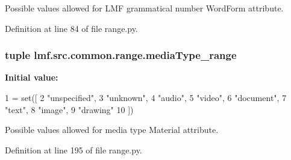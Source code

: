 Possible values allowed for L\+M\+F grammatical number Word\+Form attribute. 



Definition at line 84 of file range.\+py.

\hypertarget{namespacelmf_1_1src_1_1common_1_1range_a61963614ed4bb258825e4104a8b47014}{
\subsubsection[{media\+Type\+\_\+range}]{\setlength{\rightskip}{0pt plus 5cm}tuple lmf.\+src.\+common.\+range.\+media\+Type\+\_\+range}}\label{namespacelmf_1_1src_1_1common_1_1range_a61963614ed4bb258825e4104a8b47014}
{\bfseries Initial value\+:}
\begin{DoxyCode}
1 = set([
2     \textcolor{stringliteral}{"unspecified"},
3     \textcolor{stringliteral}{"unknown"},
4     \textcolor{stringliteral}{"audio"},
5     \textcolor{stringliteral}{"video"},
6     \textcolor{stringliteral}{"document"},
7     \textcolor{stringliteral}{"text"},
8     \textcolor{stringliteral}{"image"},
9     \textcolor{stringliteral}{"drawing"}
10 ])
\end{DoxyCode}


Possible values allowed for media type Material attribute. 



Definition at line 195 of file range.\+py.

